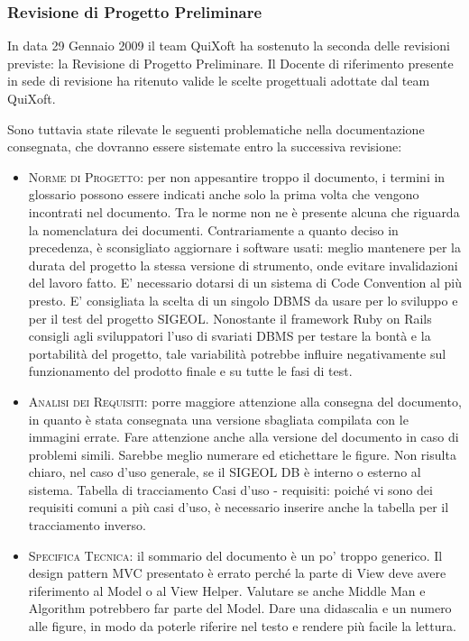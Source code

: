 \documentclass[11pt,a4paper]{article}
\begin{document}
\subsubsection{Revisione di Progetto Preliminare}
In data 29 Gennaio 2009 il team QuiXoft ha sostenuto la seconda delle revisioni previste: la Revisione di Progetto Preliminare.
Il Docente di riferimento presente in sede di revisione ha ritenuto valide le scelte progettuali adottate dal team QuiXoft.

Sono tuttavia state rilevate le seguenti problematiche nella documentazione consegnata, che dovranno essere sistemate entro la successiva revisione:
\begin{itemize}
\item \textsc{Norme di Progetto:} per non appesantire troppo il documento, i termini in glossario possono essere indicati anche solo la
prima volta che vengono incontrati nel documento.
Tra le norme non ne è presente alcuna che riguarda la nomenclatura dei documenti.
Contrariamente a quanto deciso in precedenza, è sconsigliato aggiornare i software usati: meglio mantenere per la durata del progetto la stessa versione di strumento, onde evitare invalidazioni del lavoro fatto.
E' necessario dotarsi di un sistema di Code Convention al più presto.
E' consigliata la scelta di un singolo DBMS da usare per lo sviluppo e per il test del progetto SIGEOL. Nonostante il framework Ruby on Rails consigli agli sviluppatori l'uso di svariati DBMS per testare la bontà e la portabilità del progetto, tale variabilità potrebbe influire negativamente sul funzionamento del prodotto finale e su tutte le fasi di test.
\item \textsc{Analisi dei Requisiti:} porre maggiore attenzione alla consegna del documento, in quanto è stata consegnata una versione sbagliata compilata con le immagini errate. Fare attenzione anche alla versione del documento in caso di problemi simili.
Sarebbe meglio numerare ed etichettare le figure.
Non risulta chiaro, nel caso d'uso generale, se il SIGEOL DB è interno o esterno al sistema.
Tabella di tracciamento Casi d'uso - requisiti: poiché vi sono dei requisiti comuni a più casi d'uso, è necessario inserire anche la tabella per il tracciamento inverso.
\item \textsc{Specifica Tecnica:} il sommario del documento è un po' troppo generico.
Il design pattern MVC presentato è errato perché la parte di View deve avere riferimento al Model o al View Helper.
Valutare se anche Middle Man e Algorithm potrebbero far parte del Model.
Dare una didascalia e un numero alle figure, in modo da poterle riferire nel testo e rendere più facile la lettura.

\end{itemize}
\end{document}
